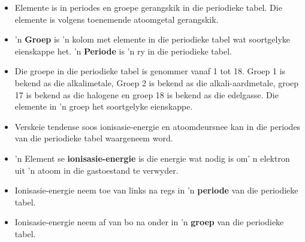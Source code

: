             \label{m38757*uid0123}\begin{itemize}[noitemsep]
            \label{m38757*id79342}\item Elemente is in periodes en groepe gerangskik in die periodieke tabel. Die elemente is volgens toenemende atoomgetal gerangskik.
\label{m38757*id97342}\item 'n \textbf{Groep} is 'n kolom met elemente in die periodieke tabel wat soortgelyke eienskappe het. 'n \textbf{Periode} is 'n ry in die periodieke tabel.
\item Die groepe in die periodieke tabel is genommer vanaf 1 tot 18. Groep 1 is bekend as die alkalimetale, Groep 2 is bekend as die alkali-aardmetale, groep 17 is bekend as die halogene en groep 18 is bekend as die edelgasse. Die elemente in 'n groep het soortgelyke eienskappe.
\item Verskeie tendense soos ionisasie-energie en atoomdeursnee kan in die periodes van die periodieke tabel waargeneem word. \label{m38757*uid184}
\label{m38757*uid186}\item 'n Element se \textbf{ionisasie-energie} is die energie wat nodig is om' n elektron uit 'n atoom in die gastoestand te verwyder.
\label{m38757*uid187}\item Ionisasie-energie neem toe van links na regs in 'n \textbf{periode} van die periodieke tabel.
\label{m38757*uid188}\item Ionisasie-energie neem af van bo na onder in 'n \textbf{groep} van die periodieke tabel.
\end{itemize}
        \label{m38757*eip-219}
            



